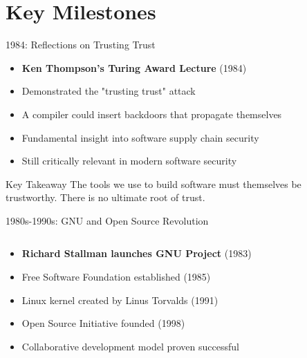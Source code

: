 \documentclass{beamer}
\begin{document}
\section{Key Milestones}

\begin{frame}{1984: Reflections on Trusting Trust}
\begin{itemize}
    \item \textbf{Ken Thompson's Turing Award Lecture} (1984)
    \item Demonstrated the "trusting trust" attack
    \item A compiler could insert backdoors that propagate themselves
    \item Fundamental insight into software supply chain security
    \item Still critically relevant in modern software security
\end{itemize}
\begin{alertblock}{Key Takeaway}
The tools we use to build software must themselves be trustworthy. There is no ultimate root of trust.
\end{alertblock}
\end{frame}

\begin{frame}{1980s-1990s: GNU and Open Source Revolution}
\begin{columns}
    \begin{column}{0.6\textwidth}
        \begin{itemize}
            \item \textbf{Richard Stallman launches GNU Project} (1983)
            \item Free Software Foundation established (1985)
            \item Linux kernel created by Linus Torvalds (1991)
            \item Open Source Initiative founded (1998)
            \item Collaborative development model proven successful
        \end{itemize}
    \end{column}
    \begin{column}{0.4\textwidth}
    \end{column}
\end{columns}
\end{frame}
\end{document}
